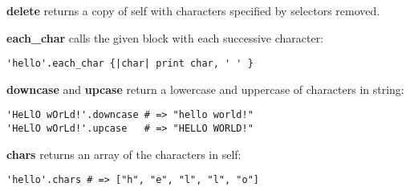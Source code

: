 
\textbf{delete} returns a copy of self with characters specified by selectors removed.

\textbf{each\_char} calls the given block with each successive character:

\begin{verbatim}
'hello'.each_char {|char| print char, ' ' }
\end{verbatim}

\textbf{downcase} and \textbf{upcase} return a lowercase and uppercase of characters in string:
\begin{verbatim}
'HeLlO wOrLd!'.downcase # => "hello world!"
'HeLlO wOrLd!'.upcase   # => "HELLO WORLD!"
\end{verbatim}

\textbf{chars} returns an array of the characters in self:
\begin{verbatim}
'hello'.chars # => ["h", "e", "l", "l", "o"]
\end{verbatim}



%
